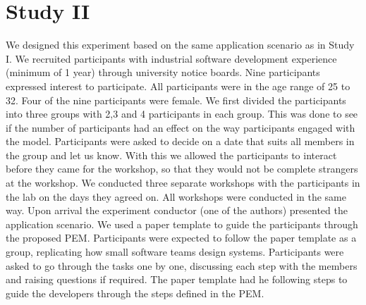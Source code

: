 \documentclass{sigchi}
\begin{document}
\section{Study II}

We designed this experiment based on the same application scenario as in Study I. We recruited participants with industrial software development experience (minimum of 1 year) through university notice boards. Nine participants expressed interest to participate. All participants were in the age range of 25 to 32. Four of the nine participants were female. We first divided the participants into three groups with 2,3 and 4 participants in each group. This was done to see if the number of participants had an effect on the way participants engaged with the model. Participants were asked to decide on a date that suits all members in the group and let us know. With this we allowed the participants to interact before they came for the workshop, so that they would not be complete strangers at the workshop. We conducted three separate workshops with the participants in the lab on the days they agreed on. All workshops were conducted in the same way. Upon arrival the experiment conductor (one of the authors) presented the application scenario. We used a paper template to guide the participants through the proposed PEM. Participants were expected to follow the paper template as a group, replicating how small software teams design systems. Participants were asked to go through the tasks one by one, discussing each step with the members and raising questions if required. The paper template had he following steps to guide the developers through the steps defined in the PEM.
\end{document}
